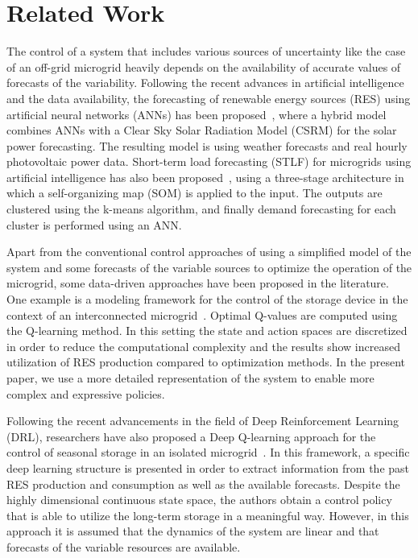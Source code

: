 \documentclass{article}
\begin{document}
\section{Related Work} \label{sec: RelatedWork}

	The control of a system that includes various sources of uncertainty like the case of an off-grid microgrid heavily depends on the availability of accurate values of forecasts of the variability. Following the recent advances in artificial intelligence and the data availability, the forecasting of renewable energy sources (RES) using artificial neural networks (ANNs) has been proposed~\cite{Leva2019}, where a hybrid model combines ANNs with a Clear Sky Solar Radiation Model (CSRM) for the solar power forecasting. The resulting model is using weather forecasts and real hourly photovoltaic power data. Short-term load forecasting (STLF) for microgrids using artificial intelligence has also been proposed~\cite{Hernandez2014}, using a three-stage architecture in which a self-organizing map (SOM) is applied to the input. The outputs are clustered using the k-means algorithm, and finally demand forecasting for each cluster is performed using an ANN.

	Apart from the conventional control approaches of using a simplified model of the system and some forecasts of the variable sources to optimize the operation of the microgrid, some data-driven approaches have been proposed in the literature. One example is a modeling framework for the control of the storage device in the context of an interconnected microgrid~\cite{Kuznetsova2013}. Optimal Q-values are computed using the Q-learning method. In this setting the state and action spaces are discretized in order to reduce the computational complexity and the results show increased utilization of RES production compared to optimization methods. In the present paper, we use a more detailed representation of the system to enable more complex and expressive policies.

	Following the recent advancements in the field of Deep Reinforcement Learning (DRL), researchers have also proposed a Deep Q-learning approach for the control of seasonal storage in an isolated microgrid~\cite{franccois2016deep}. In this framework, a specific deep learning structure is presented in order to extract information from the past RES production and consumption as well as the available forecasts. Despite the highly dimensional continuous state space, the authors obtain a control policy that is able to utilize the long-term storage in a meaningful way. However, in this approach it is assumed that the dynamics of the system are linear and that forecasts of the variable resources are available.
\end{document}
